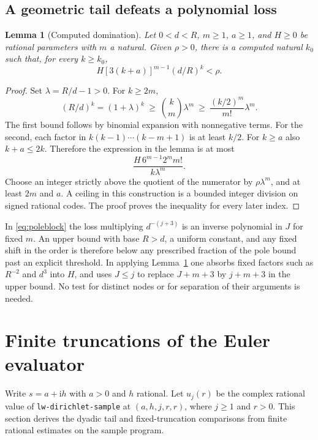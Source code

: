 \documentclass[11pt]{amsart}
\newtheorem{lemma}[theorem]{Lemma}
\theoremstyle{definition}
\theoremstyle{remark}
\numberwithin{equation}{section}
\newcommand{\code}[1]{\nolinkurl{#1}}
\begin{document}
\subsection{A geometric tail defeats a polynomial loss}

\begin{lemma}[Computed domination]\label{lem:geometric}
Let $0<d<R$, $m\ge1$, $a\ge1$, and $H\ge0$ be
rational parameters with $m$ a natural. Given $\rho>0$,
there is a computed natural $k_0$ such that, for every $k\ge k_0$,
\[
 H[3(k+a)]^{m-1}(d/R)^k<\rho .
\]
\end{lemma}
\begin{proof}
Set $\lambda=R/d-1>0$. For $k\ge2m$,
\[
 (R/d)^k=(1+\lambda)^k
 \ \ge\ \binom{k}{m}\lambda^m
 \ \ge\ \frac{(k/2)^m}{m!}\lambda^m .
\]
The first bound follows by binomial expansion with nonnegative terms.
For the second, each factor in $k(k-1)\cdots(k-m+1)$ is at least
$k/2$. For $k\ge a$ also $k+a\le2k$. Therefore the expression
in the lemma is at most
\[
  \frac{H\,6^{m-1}2^m m!}{k\lambda^m}.
\]
Choose an integer strictly above the quotient of the numerator
by $\rho\lambda^m$, and at least $2m$ and $a$. A ceiling in this
construction is a bounded integer division on signed rational codes.
The proof proves the inequality for every later index.
\end{proof}

In \eqref{eq:poleblock} the loss multiplying $d^{-(j+3)}$ is
an inverse polynomial in $J$ for fixed $m$. An upper bound with
base $R>d$, a uniform constant, and any fixed shift in the order
is therefore below any prescribed fraction of the pole bound
past an explicit threshold. In applying Lemma~\ref{lem:geometric}
one absorbs fixed factors such as $R^{-2}$ and $d^3$ into $H$,
and uses $J\le j$ to replace $J+m+3$ by $j+m+3$ in the upper bound.
No test for distinct nodes or for separation of their arguments is needed.

\section{Finite truncations of the Euler evaluator}
\label{sec:euler-truncations}

Write $s=a+\mathrm i h$ with $a>0$ and $h$ rational.
Let $u_j(r)$ be the complex rational value of
\code{lw-dirichlet-sample} at $(a,h,j,r,r)$, where $j\ge1$ and $r>0$.
This section derives the dyadic tail and fixed-truncation
comparisons from finite rational estimates on the sample program.
\end{document}
